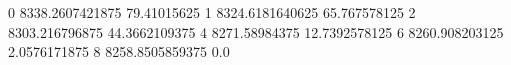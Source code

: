 0 8338.2607421875 79.41015625
1 8324.6181640625 65.767578125
2 8303.216796875 44.3662109375
4 8271.58984375 12.7392578125
6 8260.908203125 2.0576171875
8 8258.8505859375 0.0
